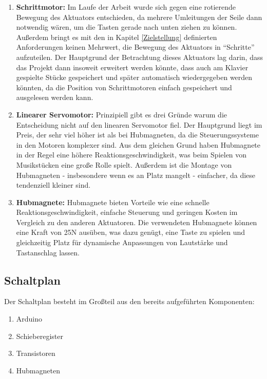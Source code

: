 \begin{enumerate}
	\item \textbf{Schrittmotor:} Im Laufe der Arbeit wurde sich gegen eine rotierende Bewegung des Aktuators entschieden, da mehrere Umleitungen der Seile dann notwendig wären, um die Tasten gerade nach unten ziehen zu können.
	Außerdem bringt es mit den in Kapitel \ref{Zielstellung} definierten Anforderungen keinen Mehrwert,
	die Bewegung des Aktuators in \enquote{Schritte} aufzuteilen. Der Hauptgrund der Betrachtung dieses Aktuators lag darin,
	dass das Projekt dann insoweit erweitert werden könnte, dass auch am Klavier
	gespielte Stücke gespeichert und später automatisch wiedergegeben werden könnten, da die Position von Schrittmotoren einfach gespeichert und ausgelesen werden kann.
	\item \textbf{Linearer Servomotor:} Prinzipiell gibt es drei Gründe warum die Entscheidung nicht auf den linearen Servomotor fiel.
	Der Hauptgrund liegt im Preis, der sehr viel höher ist als bei Hubmagneten, da die Steuerungssysteme in den Motoren komplexer sind.
	Aus dem gleichen Grund haben Hubmagnete in der Regel eine höhere Reaktionsgeschwindigkeit, was beim Spielen von Musikstücken eine große Rolle spielt.
	Außerdem ist die Montage von Hubmagneten - insbesondere wenn es an Platz mangelt - einfacher, da diese tendenziell kleiner sind.
	\item \textbf{Hubmagnete:} Hubmagnete bieten Vorteile wie eine schnelle Reaktionsgeschwindigkeit, einfache Steuerung und geringen Kosten im Vergleich zu den anderen Aktuatoren. Die verwendeten Hubmagnete können eine Kraft von 25N ausüben,
	was dazu genügt, eine Taste  zu spielen und gleichzeitig Platz für dynamische Anpassungen von Lautstärke und Tastanschlag lassen.
\end{enumerate}

\subsection{Schaltplan} \label{subsec:schaltplan}

Der Schaltplan besteht im Großteil aus den bereits aufgeführten Komponenten:

\begin{enumerate}
	\item Arduino
	\item Schieberegister
	\item Transistoren
	\item Hubmagneten
\end{enumerate}

